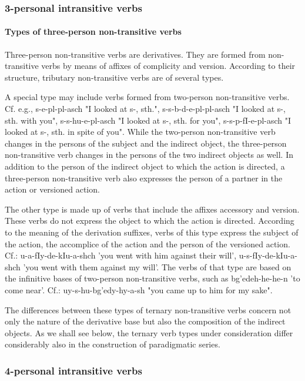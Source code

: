\documentclass[a4paper,12pt]{book}
\newcommand{\1}[1]{\textbf{\emph{#1}}} %
\newcommand{\2}[1]{\textbf{[#1]}} %
\newcommand{\3}[1]{\fontsize{11pt}{0cm}\textbf{\emph{#1}}} %
\newcommand{\4}[1]{\fontsize{10pt}{0cm}\emph{#1}}	%
\newcommand{\5}[1]{\textbf{/#1/}} %
\newcommand{\6}[1]{\textbf{[#1]}} %
\newcommand{\7}[1]{\fontsize{12pt}{0cm}\emph{#1}} %
\newcommand{\8}[1]{\fontsize{12pt}{0cm}`#1'} %
\newcommand{\9}[1]{\fontsize{12pt}{0cm}(lit. `#1')} %
\begin{document}
\subsubsection{3-personal intransitive verbs}
\paragraph{Types of three-person non-transitive verbs}
Three-person non-transitive verbs are derivatives. They are formed from non-transitive verbs by means of affixes of complicity and version. According to their structure, tributary non-transitive verbs are of several types.

A special type may include verbs formed from two-person non-transitive verbs. Cf. e.g., s-e-pl-pl-asch "I looked at s-, sth.", s-s-b-d-e-pl-pl-asch "I looked at s-, sth. with you", s-s-hu-e-pl-asch "I looked at s-, sth. for you", s-s-p-fI-e-pl-asch "I looked at s-, sth. in spite of you". While the two-person non-transitive verb changes in the persons of the subject and the indirect object, the three-person non-transitive verb changes in the persons of the two indirect objects as well. In addition to the person of the indirect object to which the action is directed, a three-person non-transitive verb also expresses the person of a partner in the action or versioned action.

The other type is made up of verbs that include the affixes accessory and version. These verbs do not express the object to which the action is directed. According to the meaning of the derivation suffixes, verbs of this type express the subject of the action, the accomplice of the action and the person of the versioned action. Cf.: u-a-fIy-de-kIu-a-shch 'you went with him against their will', u-s-fIy-de-kIu-a-shch 'you went with them against my will'. The verbs of that type are based on the infinitive bases of two-person non-transitive verbs, such as bg'edeh-he-he-n 'to come near'. Cf.: uy-s-hu-bg'edy-hy-a-sh "you came up to him for my sake".

The differences between these types of ternary non-transitive verbs concern not only the nature of the derivative base but also the composition of the indirect objects. As we shall see below, the ternary verb types under consideration differ considerably also in the construction of paradigmatic series.
\subsubsection{4-personal intransitive verbs}
\end{document}
